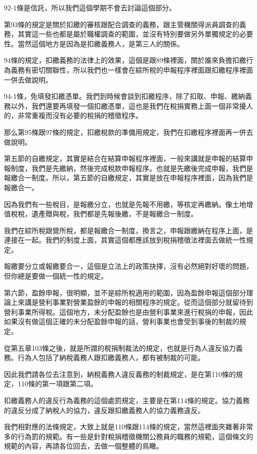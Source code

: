 \documentclass[]{ctexbook}
\begin{document}
92-1條是信託，所以我們這個學期不會去討論這個部分。

第93條的規定是關於扣繳的審核跟配合調查的義務，跟主管機關得派員調查的義務，其實這一些也都是屬於職權調查的範圍，並沒有特別要做另外單獨規定的必要性。當然這個地方是因為是扣繳義務人，是第三人的關係。

94條的規定，扣繳義務的法律上的效果，這個是跟89條裡面，關於誰來負擔扣繳行為義務有密切關聯性，所以我們也一樣會在綜所稅的申報程序裡面跟扣繳程序裡面一併去做說明。

94-1條，免填發扣繳憑單。我們到時候會談到扣繳程序，除了扣取、申報、繳納義務以外，我們還要再填發一個扣繳憑單，這也是我們在稅捐實務上面一個非常擾人的，非常重複而沒有必要的稅捐的稽徵程序。

那么第95條跟97條的規定，扣繳稅款的準備用規定，我們在扣繳程序裡面再一併去做說明。

第五節的自繳規定，其實是結合在結算申報程序裡面，一般來講就是申報的結算申報制度，我們是先繳納，然後完成稅款申報程序。也就是先繳後完成申報，我們是報繳合一制度。所以，第五節的自繳規定，其實是放在申報程序裡面，因為我們是報繳合一。

因為我們有一些稅目，是報繳分立，也就是先報不用繳，等核定再繳納。像土地增值稅稅，遺產贈與稅，我們都是先報後繳，不是報繳合一制度。

我們在綜所稅跟營所稅，都是報繳合一制度，換言之，申報跟繳納在程序上面，是連接在一起。我們的制度上面，其實這個都應該放到稅捐稽徵法裡面去做統一性規定。

報繳要分立或報繳要合一，這個是立法上的政策抉擇，沒有必然絕對好壞的問題，但你總是要做一個統一性的規定。

第六節，盈餘申報，很明顯，並不是綜所稅適用的範圍，因為盈餘申報這個部分理論上來講是營利事業對營業盈餘的申報的相關程序的規定。從而這個部分就留待到營利事業所得稅。這個地方，未分配盈餘也是由營利事業來進行稅捐的申報，因此如果沒有做這個正確的未分配盈餘申報的話，營利事業也會受到事後的制裁的規定。

從第五章103條之後，就是所謂的稅捐制裁法的規定，也就是行為人違反協力義務。行為人包括了納稅義務人跟扣繳義務人，都有被制裁的可能。

因此我們請各位去注意到，納稅義務人違反義務的制裁規定，是在第110條的規定，110條的第一項跟第二項。

扣繳義務人的違反行為義務的這個處罰規定，主要是在第114條的規定。協力義務的違反分成了納稅人的協力，違反跟扣繳義務人的協力義務違反。

我們相對應的法條規定，大致上就是110條跟114條的規定，當然這裡面夾雜著非常多的行為罰的規範。有一些是針對稅捐稽徵機關公務員的職務的規範，這個條文的規範的內容，再請各位回去，去做一個整體的鳥瞰。
\end{document}

